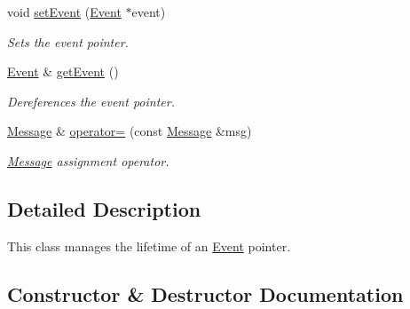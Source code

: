 \begin{DoxyCompactItemize}
\mbox{\label{class_arcana_1_1_message_a467ff543095f62784bb96f0d47d5c534}} 
void \mbox{\hyperlink{class_arcana_1_1_message_a467ff543095f62784bb96f0d47d5c534}{set\+Event}} (\mbox{\hyperlink{class_arcana_1_1_event}{Event}} $\ast$event)
\begin{DoxyCompactList}\small\item\em Sets the event pointer. \end{DoxyCompactList}\item 
\mbox{\label{class_arcana_1_1_message_a3144ea29e7d6690d739b6108a982682e}} 
\mbox{\hyperlink{class_arcana_1_1_event}{Event}} \& \mbox{\hyperlink{class_arcana_1_1_message_a3144ea29e7d6690d739b6108a982682e}{get\+Event}} ()
\begin{DoxyCompactList}\small\item\em Dereferences the event pointer. \end{DoxyCompactList}\item 
\mbox{\label{class_arcana_1_1_message_ad95056caca487439a787772ae62de53e}} 
\mbox{\hyperlink{class_arcana_1_1_message}{Message}} \& \mbox{\hyperlink{class_arcana_1_1_message_ad95056caca487439a787772ae62de53e}{operator=}} (const \mbox{\hyperlink{class_arcana_1_1_message}{Message}} \&msg)
\begin{DoxyCompactList}\small\item\em \mbox{\hyperlink{class_arcana_1_1_message}{Message}} assignment operator. \end{DoxyCompactList}\end{DoxyCompactItemize}


\subsection{Detailed Description}
This class manages the lifetime of an \mbox{\hyperlink{class_arcana_1_1_event}{Event}} pointer. 

\subsection{Constructor \& Destructor Documentation}
\mbox{\label{class_arcana_1_1_message_aca77fd2984b45c908631451d1ab29fa1}} 
